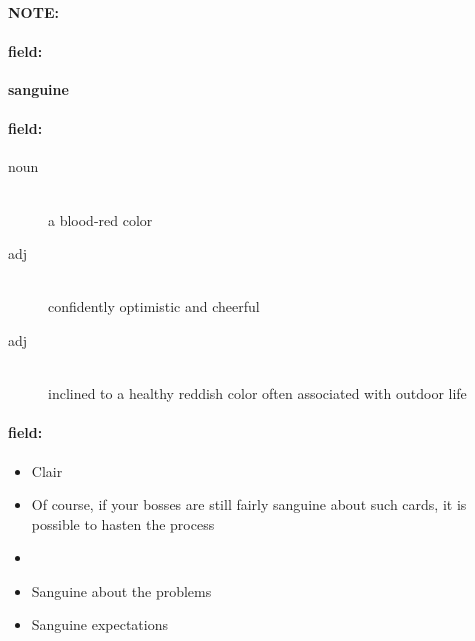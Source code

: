 \documentclass[12pt]{article}
\newenvironment{note}{\paragraph{NOTE:}}{}
\newenvironment{field}{\paragraph{field:}}{}
\begin{document}
\begin{note}
\begin{field}
\textbf{\large sanguine}
\end{field}


\begin{field}
\begin{description}
\item[noun] \hfill \\ 
a blood-red color

\item[adj] \hfill \\ 
confidently optimistic and cheerful

\item[adj] \hfill \\ 
inclined to a healthy reddish color often associated with outdoor life

\end{description}
\end{field}

\begin{field}
\begin{itemize}
\item  Clair
\item Of course, if your bosses are still fairly sanguine about such cards, it is possible to hasten the process
\item 
\item Sanguine about the problems
\item Sanguine expectations
\end{itemize}
\end{field}
\end{note}
\end{document}
